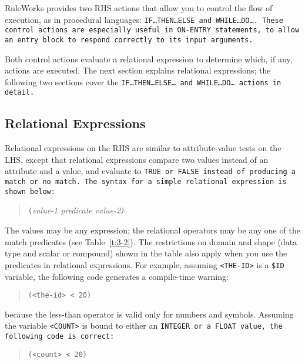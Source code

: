 RuleWorks provides two RHS actions that allow you to control the flow
of execution, as in procedural languages:
\tt{IF}\ldots\tt{THEN}\ldots\tt{ELSE} and
\tt{WHILE}\ldots\tt{DO}\ldots. These control actions are especially
useful in \tt{ON-ENTRY} statements, to allow an entry block to respond
correctly to its input arguments.

Both control actions evaluate a relational expression to determine
which, if any, actions are executed. The next section explains
relational expressions; the following two sections cover the
\tt{IF}\ldots\tt{THEN}\ldots\tt{ELSE}\ldots{} and
\tt{WHILE}\ldots\tt{DO}\ldots{} actions in detail.

\subsection{Relational Expressions}

Relational expressions on the RHS are similar to attribute-value tests
on the LHS, except that relational expressions compare two values
instead of an attribute and a value, and evaluate to \tt{TRUE} or
\tt{FALSE} instead of producing a match or no match. The syntax for a
simple relational expression is shown below:

\begin{quote}
\verb|(|\it{value-1} \it{predicate} \it{value-2}\verb|)|
\end{quote}

The values may be any expression; the relational operators may be any
one of the match predicates (see Table~\ref{t:3-2}). The restrictions
on domain and shape (data type and scalar or compound) shown in the
table also apply when you use the predicates in relational
expressions. For example, assuming \verb|<THE-ID>| is a
\verb|$ID| variable, the following code generates a compile-time
warning:

\begin{quote}
\begin{verbatim}
(<the-id> < 20)
\end{verbatim}
\end{quote}

because the less-than operator is valid only for numbers and
symbols. Assuming the variable \verb|<COUNT>| is bound to either an
\tt{INTEGER} or a \tt{FLOAT} value, the following code is correct:

\begin{quote}
\begin{verbatim}
(<count> < 20)
\end{verbatim}
\end{quote}

